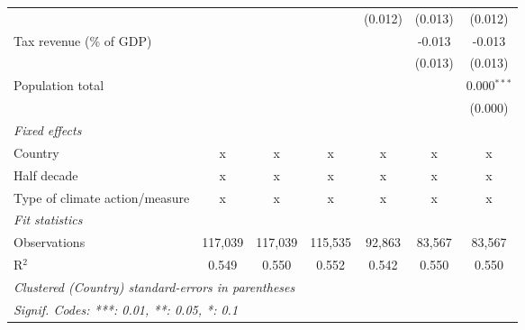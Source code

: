 \begin{tabular}{lcccccc}
                                                     &         &                &               & (0.012)        & (0.013)        & (0.012)\\   
   Tax revenue (\% of GDP)                           &         &                &               &                & -0.013         & -0.013\\   
                                                     &         &                &               &                & (0.013)        & (0.013)\\   
   Population total                                  &         &                &               &                &                & 0.000$^{***}$\\   
                                                     &         &                &               &                &                & (0.000)\\   
   \emph{Fixed effects}\\
   Country                                           & x       & x              & x             & x              & x              & x\\  
   Half decade                                       & x       & x              & x             & x              & x              & x\\  
   Type of climate action/measure                    & x       & x              & x             & x              & x              & x\\  
   \midrule \emph{Fit statistics}\\
   Observations                                      & 117,039 & 117,039        & 115,535       & 92,863         & 83,567         & 83,567\\  
   R$^2$                                             & 0.549   & 0.550          & 0.552         & 0.542          & 0.550          & 0.550\\  
   \midrule
   \multicolumn{7}{l}{\emph{Clustered (Country) standard-errors in parentheses}}\\
   \multicolumn{7}{l}{\emph{Signif. Codes: ***: 0.01, **: 0.05, *: 0.1}}\\
\end{tabular}
\par\endgroup


